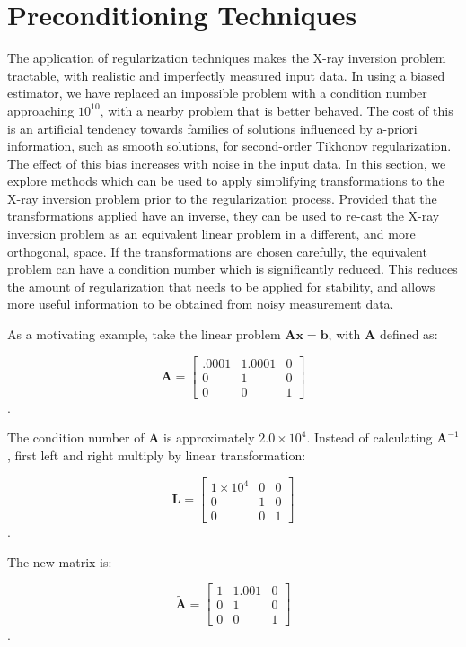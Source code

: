 \section{Preconditioning Techniques}

The application of regularization techniques makes the X-ray inversion problem tractable, with realistic and imperfectly measured input data. In using a biased estimator, we have replaced an impossible problem with a condition number approaching $10^{10}$, with a nearby problem that is better behaved. The cost of this is an artificial tendency towards families of solutions influenced by a-priori information, such as smooth solutions, for second-order Tikhonov regularization. The effect of this bias increases with noise in the input data. In this section, we explore methods which can be used to apply simplifying transformations to the X-ray inversion problem prior to the regularization process. Provided that the transformations applied have an inverse, they can be used to re-cast the X-ray inversion problem as an equivalent linear problem in a different, and more orthogonal, space. If the transformations are chosen carefully, the equivalent problem can have a condition number which is significantly reduced. This reduces the amount of regularization that needs to be applied for stability, and allows more useful information to be obtained from noisy measurement data. 

As a motivating example, take the linear problem $\mathbf{A}\mathbf{x} = \mathbf{b}$, with $\mathbf{A}$ defined as:

\[
\mathbf{A} = \begin{bmatrix} 
    .0001 & 1.0001 & 0 \\
    0 & 1 & 0 \\
    0 & 0 & 1
    \end{bmatrix}
\].

The condition number of $\mathbf{A}$ is approximately $2.0\times10^{4}$. Instead of calculating $\mathbf{A}^{-1}$, first left and right multiply by linear transformation:

\[
\mathbf{L} = \begin{bmatrix} 
    1\times10^4 & 0 & 0  \\
    0 & 1  & 0 \\
    0 & 0 & 1
    \end{bmatrix}
\].

The new matrix is:

\[
\mathbf{\tilde{A}} = \begin{bmatrix} 
    1 & 1.001 & 0  \\
    0 & 1  & 0 \\
    0 & 0 & 1
    \end{bmatrix}
\].

